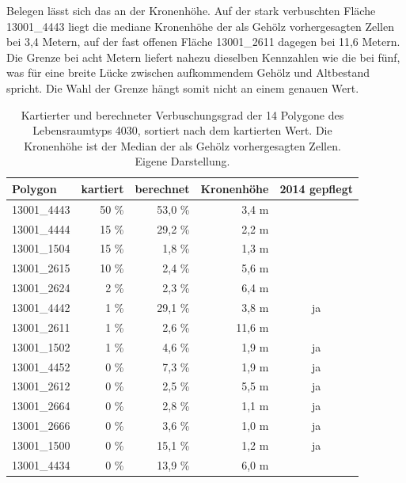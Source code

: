 Belegen lässt sich das an der Kronenhöhe. Auf der stark verbuschten Fläche 13001\_4443 liegt die mediane Kronenhöhe der als Gehölz vorhergesagten Zellen bei 3,4 Metern, auf der fast offenen Fläche 13001\_2611 dagegen bei 11,6 Metern. Die Grenze bei acht Metern liefert nahezu dieselben Kennzahlen wie die bei fünf, was für eine breite Lücke zwischen aufkommendem Gehölz und Altbestand spricht. Die Wahl der Grenze hängt somit nicht an einem genauen Wert.

\begin{table}[H]
    \centering
    \caption[Kartierter und berechneter Verbuschungsgrad der
    Heidepolygone]{Kartierter und berechneter Verbuschungsgrad der 14 Polygone
    des Lebensraumtyps 4030, sortiert nach dem kartierten Wert. Die Kronenhöhe
    ist der Median der als Gehölz vorhergesagten Zellen.
    Eigene Darstellung.}
    \label{tab:heidepolygone}
    \begin{tabular}{lrrrc}
    \hline
    Polygon & kartiert & berechnet & Kronenhöhe & 2014 gepflegt \\
    \hline
    13001\_4443 & 50 \% & 53,0 \% & 3,4 m  &     \\
    13001\_4444 & 15 \% & 29,2 \% & 2,2 m  &     \\
    13001\_1504 & 15 \% & 1,8 \%  & 1,3 m  &     \\
    13001\_2615 & 10 \% & 2,4 \%  & 5,6 m  &     \\
    13001\_2624 & 2 \%  & 2,3 \%  & 6,4 m  &     \\
    13001\_4442 & 1 \%  & 29,1 \% & 3,8 m  & ja  \\
    13001\_2611 & 1 \%  & 2,6 \%  & 11,6 m &     \\
    13001\_1502 & 1 \%  & 4,6 \%  & 1,9 m  & ja  \\
    13001\_4452 & 0 \%  & 7,3 \%  & 1,9 m  & ja  \\
    13001\_2612 & 0 \%  & 2,5 \%  & 5,5 m  & ja  \\
    13001\_2664 & 0 \%  & 2,8 \%  & 1,1 m  & ja  \\
    13001\_2666 & 0 \%  & 3,6 \%  & 1,0 m  & ja  \\
    13001\_1500 & 0 \%  & 15,1 \% & 1,2 m  & ja  \\
    13001\_4434 & 0 \%  & 13,9 \% & 6,0 m  &     \\
    \hline
    \end{tabular}
\end{table}

